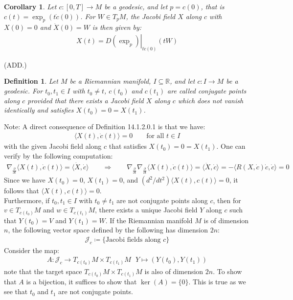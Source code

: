 \documentclass[11pt]{book}
\theoremstyle{break}
\theoremstyle{break}
\newtheorem{corT}[lem]{Corollary}
\newtheorem{defn}{Definition}[corL]
\newcommand{\R}{\mathbb{R}}
\newcommand{\pd}{\partial}
\newcommand{\note}{\color{red}Note: \color{black}}
\begin{document}
\begin{corT}
Let $c:[0,T]\to M$ be a geodesic, and let $p = c(0)$, that is $c(t) = \exp_p(t\dot{c}(0))$. For $W \in T_pM$, the Jacobi field $X$ along $c$ with $X(0) = 0$ and $\dot{X}(0) = W$ is then given by:
\begin{align*}
X(t) = \left.D(\exp_p)\right|_{t\dot{c}(0)}(tW)
\end{align*}
\end{corT}

(ADD.)


\begin{defn}
Let $M$ be a Riemannian manifold, $I \subseteq \R$, and let $c:I \to M$ be a geodesic. For $t_0,t_1 \in I$ with $t_0 \neq t$, $c(t_0)$ and $c(t_1)$ are called conjugate points along $c$ provided that there exists a Jacobi field $X$ along $c$ which does not vanish identically and satisfies $X(t_0) = 0 = X(t_1)$. 
\end{defn}

\note A direct consequence of Definition 14.1.2.0.1 is that we have:
\begin{align*}
\langle X(t) , \dot{c}(t) \rangle = 0 \qquad \text{for all }t \in I
\end{align*}
with the given Jacobi field along $c$ that satisfies $X(t_0) = 0 = X(t_1)$. One can verify by the following computation:
\begin{align*}
\nabla_{\frac{\pd}{\pd t}} \langle X(t), \dot{c}(t) \rangle = \langle \dot{X}, \dot{c}\rangle \qquad \Rightarrow \qquad \nabla_{\frac{\pd}{\pd t}}\nabla_{\frac{\pd}{\pd t}}\langle X(t), \dot{c}(t) \rangle = \langle \ddot{X}, \dot{c}\rangle = -\langle R(X,\dot{c})\dot{c},\dot{c}\rangle = 0
\end{align*}
Since we have $X(t_0) = 0$, $X(t_1) = 0$, and $(d^2/dt^2)\langle X(t),c(t)\rangle = 0$, it follows that $\langle X(t),c(t)\rangle = 0$.\\


Furthermore, if $t_0,t_1 \in I$ with $t_0 \neq t_1$ are not conjugate points along $c$, then for $v \in T_{c(t_0)}M$ and $w \in T_{c(t_1)}M$, there exists a unique Jacobi field $Y$ along $c$ such that $Y(t_0) = V$ and $Y(t_1) = W$. If the Riemannian manifold $M$ is of dimension $n$, the following vector space defined by the following has dimension $2n$:
\begin{align*}
\mathcal{J}_c \coloneqq \{ \text{Jacobi fields along }c\}
\end{align*}
Consider the map:
\begin{align*}
A: \mathcal{J}_c \to T_{c(t_0)}M \times T_{c(t_1)}M \ \ \ Y \mapsto (Y(t_0), Y(t_1))
\end{align*}
note that the target space $T_{c(t_0)}M \times T_{c(t_1)}M $ is also of dimension $2n$. To show that $A$ is a bijection, it suffices to show that $\ker(A) = \{0\}$. This is true as we see that $t_0$ and $t_1$ are not conjugate points. 
\end{document}
